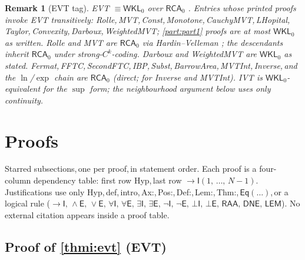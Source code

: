 \documentclass[11pt,reqno]{amsart}
\newcommand{\comma}{,\,\allowbreak}
\theoremstyle{redplain}
\newtheorem{remark}[theorem]{Remark}
\begin{document}
\setcounter{theorem}{1}
\begin{remark}[EVT tag]
	\sloppy EVT $\equiv\textsf{WKL}_0$ over $\textsf{RCA}_0$ \cite{Simpson2009}. Entries whose printed proofs invoke EVT transitively: Rolle\comma MVT\comma Const\comma Monotone\comma CauchyMVT\comma LHopital\comma Taylor\comma Convexity\comma Darboux\comma WeightedMVT; \autoref{part:part1} proofs are at most $\textsf{WKL}_0$ as written. Rolle and MVT are $\textsf{RCA}_0$ via Hardin--Velleman \cite{HardinVelleman2001}; the descendants inherit $\textsf{RCA}_0$ under strong-$C^k$-coding. Darboux and WeightedMVT are $\textsf{WKL}_0$ as stated. Fermat\comma FFTC\comma SecondFTC\comma IBP\comma Subst\comma BarrowArea\comma MVTInt\comma Inverse\comma and the $\ln$/$\exp$ chain are $\textsf{RCA}_0$ (direct; \cite{HardinVelleman2001,Yokoyama2010} for Inverse and MVTInt). IVT is $\textsf{WKL}_0$-equivalent for the $\sup$ form; the neighbourhood argument below uses only continuity.
\end{remark}

\section{Proofs}
\label{sec:core-proofs}

\noindent Starred subsections\comma one per proof\comma in statement order. Each proof is a four-column dependency table: first row \textsf{Hyp}\comma last row $\to\textsf{I}(1\comma\dots\comma N-1)$. Justifications use only \textsf{Hyp}\comma \textsf{def}\comma \textsf{intro}\comma \textsf{Ax:}\comma \textsf{Pos:}\comma \textsf{Def:}\comma \textsf{Lem:}\comma \textsf{Thm:}\comma $\textsf{Eq}(\dots)$\comma or a logical rule ($\to\textsf{I}\comma\wedge\textsf{E}\comma\vee\textsf{E}\comma\forall\textsf{I}\comma\forall\textsf{E}\comma\exists\textsf{I}\comma\exists\textsf{E}\comma\neg\textsf{I}\comma\neg\textsf{E}\comma\bot\textsf{I}\comma\bot\textsf{E}\comma\textsf{RAA}\comma\textsf{DNE}\comma\textsf{LEM}$). No external citation appears inside a proof table.

\subsection*{Proof of \autoref{thmi:evt} (\textsf{EVT})}
\end{document}
